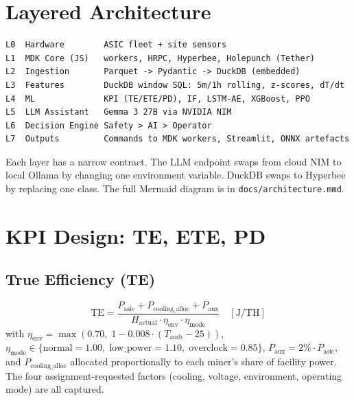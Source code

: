 \documentclass[11pt,a4paper]{article}
\begin{document}
\section{Layered Architecture}
\begin{center}
\end{center}
\begin{lstlisting}
L0  Hardware        ASIC fleet + site sensors
L1  MDK Core (JS)   workers, HRPC, Hyperbee, Holepunch (Tether)
L2  Ingestion       Parquet -> Pydantic -> DuckDB (embedded)
L3  Features        DuckDB window SQL: 5m/1h rolling, z-scores, dT/dt
L4  ML              KPI (TE/ETE/PD), IF, LSTM-AE, XGBoost, PPO
L5  LLM Assistant   Gemma 3 27B via NVIDIA NIM
L6  Decision Engine Safety > AI > Operator
L7  Outputs         Commands to MDK workers, Streamlit, ONNX artefacts
\end{lstlisting}
Each layer has a narrow contract. The LLM endpoint swaps from cloud NIM to
local Ollama by changing one environment variable. DuckDB swaps to Hyperbee
by replacing one class. The full Mermaid diagram is in
\texttt{docs/architecture.mmd}.

\section{KPI Design: TE, ETE, PD}
\subsection{True Efficiency (TE)}
\[
\text{TE} = \frac{P_{\text{asic}} + P_{\text{cooling\_alloc}} + P_{\text{aux}}}
{H_{\text{actual}} \cdot \eta_{\text{env}} \cdot \eta_{\text{mode}}}
\quad [\text{J/TH}]
\]
with $\eta_{\text{env}} = \max(0.70,\; 1 - 0.008 \cdot (T_{\text{amb}} - 25))$,
$\eta_{\text{mode}} \in \{\text{normal} = 1.00,\; \text{low\_power} = 1.10,\;
\text{overclock} = 0.85\}$, $P_{\text{aux}} = 2\% \cdot P_{\text{asic}}$, and
$P_{\text{cooling\_alloc}}$ allocated proportionally to each miner's share of
facility power. The four assignment-requested factors (cooling, voltage,
environment, operating mode) are all captured.
\end{document}
